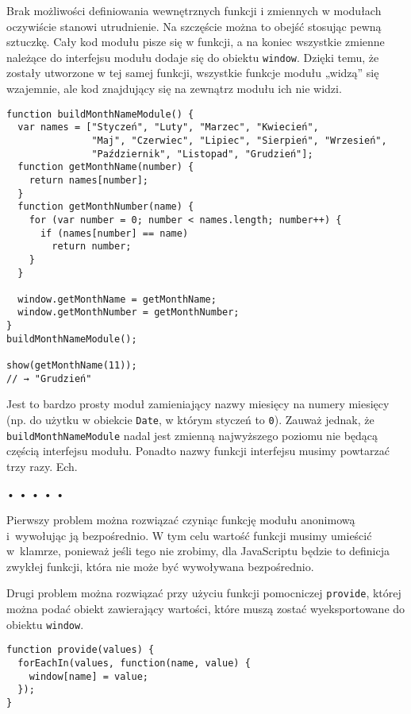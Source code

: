   
Brak możliwości definiowania wewnętrznych funkcji i zmiennych w modułach oczywiście stanowi utrudnienie. Na szczęście można to obejść stosując pewną sztuczkę. Cały kod modułu pisze się w funkcji, a na koniec wszystkie zmienne należące do interfejsu modułu dodaje się do obiektu \texttt{window}. Dzięki temu, że zostały utworzone w tej samej funkcji, wszystkie funkcje modułu „widzą” się wzajemnie, ale kod znajdujący się na zewnątrz modułu ich nie widzi.

  
\begin{verbatim} 
function buildMonthNameModule() {
  var names = ["Styczeń", "Luty", "Marzec", "Kwiecień",
               "Maj", "Czerwiec", "Lipiec", "Sierpień", "Wrzesień",
               "Październik", "Listopad", "Grudzień"];
  function getMonthName(number) {
    return names[number];
  }
  function getMonthNumber(name) {
    for (var number = 0; number < names.length; number++) {
      if (names[number] == name)
        return number;
    }
  }

  window.getMonthName = getMonthName;
  window.getMonthNumber = getMonthNumber;
}
buildMonthNameModule();

show(getMonthName(11));
// → "Grudzień"
\end{verbatim}
  
Jest to bardzo prosty moduł zamieniający nazwy miesięcy na numery miesięcy (np. do użytku w obiekcie \texttt{Date}, w którym styczeń to \texttt{0}). Zauważ jednak, że \texttt{buildMonthNameModule} nadal jest zmienną najwyższego poziomu nie będącą częścią interfejsu modułu. Ponadto nazwy funkcji interfejsu musimy powtarzać trzy razy. Ech.



\begin{center}
• • • • •
\end{center}

  
Pierwszy problem można rozwiązać czyniąc funkcję modułu anonimową i~wywołując ją bezpośrednio. W tym celu wartość funkcji musimy umieścić w~klamrze, ponieważ jeśli tego nie zrobimy, dla JavaScriptu będzie to definicja zwykłej funkcji, która nie może być wywoływana bezpośrednio.

  
Drugi problem można rozwiązać przy użyciu funkcji pomocniczej \texttt{provide}, której można podać obiekt zawierający wartości, które muszą zostać wyeksportowane do obiektu \texttt{window}.

  
\begin{verbatim} 
function provide(values) {
  forEachIn(values, function(name, value) {
    window[name] = value;
  });
}
 \end{verbatim}
  
